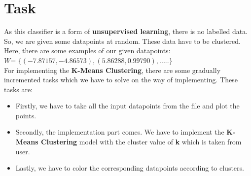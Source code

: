 \documentclass[conference]{IEEEtran}
\begin{document}
\section{Task}
As this classifier is a form of \textbf{unsupervised learning}, there is no labelled data. So, we are given some datapoints at random. These data have to be clustered. Here, there are some examples of our given datapoints:\\
$W$= $\{(-7.87157,-4.86573),(5.86288,0.99790),.....\}$\\
For implementing the \textbf{K-Means Clustering}, there are some gradually incremented tasks which we have to solve on the way of implementing. These tasks are:
\begin{itemize}  
\item Firstly, we have to take all the input datapoints from the file and plot the points.
\item Secondly, the implementation part comes. We have to implement the \textbf{K-Means Clustering} model with the cluster value of \textbf{k} which is taken from user.
\item Lastly, we have to color the corresponding datapoints according to clusters.

\end{itemize}
\end{document}
